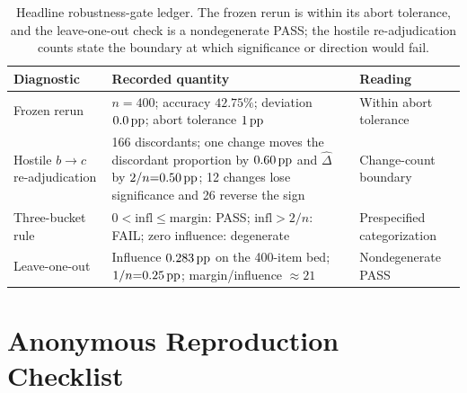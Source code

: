 \begin{table}[H]
\centering
\small
\setlength{\tabcolsep}{4pt}
\caption{Headline robustness-gate ledger.  The frozen rerun is within its
abort tolerance, and the leave-one-out check is a nondegenerate PASS; the
hostile re-adjudication counts state the boundary at which significance or
direction would fail.}
\label{tab:robustness-gates}
\begin{tabularx}{\textwidth}{@{}P{0.21\textwidth}YP{0.22\textwidth}@{}}
\toprule
Diagnostic & Recorded quantity & Reading \\
\midrule
Frozen rerun & $n{=}400$; \sconf{} accuracy $42.75\%$; deviation $0.0\,\mathrm{pp}$;
abort tolerance $1\,\mathrm{pp}$ & Within abort tolerance \\
Hostile $b\!\to\!c$ re-adjudication & 166 discordants; one change moves the
discordant proportion by $0.60\,\mathrm{pp}$ and $\widehat\Delta$ by
$2/n{=}0.50\,\mathrm{pp}$; 12 changes lose significance and 26 reverse the sign &
Change-count boundary \\
Three-bucket rule & $0{<}\mathrm{infl}{\le}\mathrm{margin}$: PASS;
$\mathrm{infl}{>}2/n$: FAIL; zero influence: degenerate & Prespecified
categorization \\
Leave-one-out & Influence $0.283\,\mathrm{pp}$ on the 400-item bed;
$1/n{=}0.25\,\mathrm{pp}$; margin/influence $\approx21$ & Nondegenerate PASS \\
\bottomrule
\end{tabularx}
\end{table}

\section{Anonymous Reproduction Checklist}
\label{app:repro}

